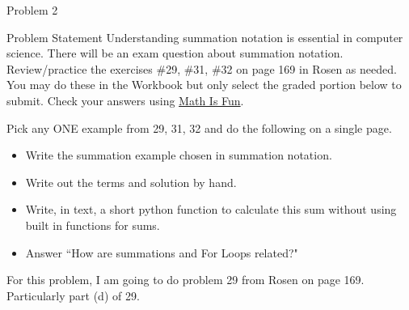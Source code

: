 \begin{problem}{Problem 2}
    \begin{statement}{Problem Statement}
        Understanding summation notation is essential in computer science. There will be an exam question about summation notation. Review/practice the exercises \#29, \#31, \#32 on page 169 in Rosen 
        as needed. You may do these in the Workbook but only select the graded portion below to submit. Check your answers using \href{https://www.mathsisfun.com/numbers/sigma-calculator.html}{Math Is Fun}. \vspace*{1em}

        Pick any ONE example from 29, 31, 32 and do the following on a single page.

        \begin{itemize}
            \item Write the summation example chosen in summation notation.
            \item Write out the terms and solution by hand.
            \item Write, in text, a short python function to calculate this sum without using built in functions for sums.
            \item Answer “How are summations and For Loops related?"
        \end{itemize}
    \end{statement}

    \begin{Highlight}[Solution - \#29]
        For this problem, I am going to do problem 29 from Rosen on page 169. Particularly part (d) of 29.


\end{Highlight}
\end{problem}
